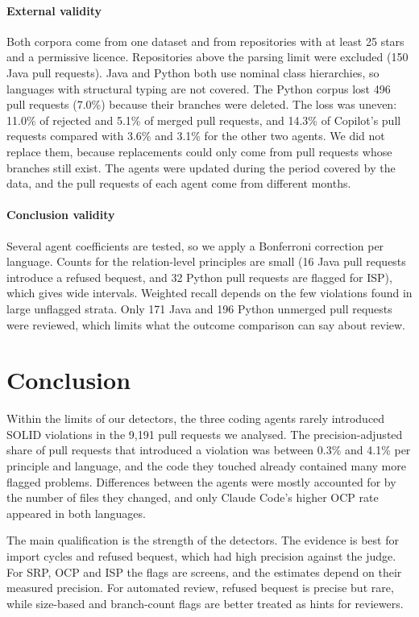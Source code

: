 \documentclass[sigconf]{acmart}
\begin{document}
\paragraph{External validity} Both corpora come from one dataset and from repositories with at least
25 stars and a permissive licence. Repositories above the parsing limit were excluded (150 Java pull
requests). Java and Python both use nominal class hierarchies, so languages with structural typing
are not covered. The Python corpus lost 496 pull requests (7.0\%) because their branches were deleted.
The loss was uneven: 11.0\% of rejected and 5.1\% of merged pull requests, and 14.3\% of Copilot's
pull requests compared with 3.6\% and 3.1\% for the other two agents. We did not replace them, because
replacements could only come from pull requests whose branches still exist. The agents were updated
during the period covered by the data, and the pull requests of each agent come from different
months.

\paragraph{Conclusion validity} Several agent coefficients are tested, so we apply a Bonferroni
correction per language. Counts for the relation-level principles are small (16 Java pull requests
introduce a refused bequest, and 32 Python pull requests are flagged for ISP), which gives wide
intervals. Weighted recall depends on the few violations found in large unflagged strata. Only 171
Java and 196 Python unmerged pull requests were reviewed, which limits what the outcome comparison can say about review.

\section{Conclusion}
\label{sec:conclusion}

Within the limits of our detectors, the three coding agents rarely introduced SOLID violations in
the 9,191 pull requests we analysed. The precision-adjusted share of pull requests that introduced a
violation was between 0.3\% and 4.1\% per principle and language, and the code they touched already
contained many more flagged problems. Differences between the agents were mostly accounted for by
the number of files they changed, and only Claude Code's higher OCP rate appeared in both languages.

The main qualification is the strength of the detectors. The evidence is best for import cycles and
refused bequest, which had high precision against the judge. For SRP, OCP and ISP the flags are
screens, and the estimates depend on their measured precision. For automated review,
refused bequest is precise but rare, while size-based and branch-count flags are better treated as
hints for reviewers.
\end{document}
